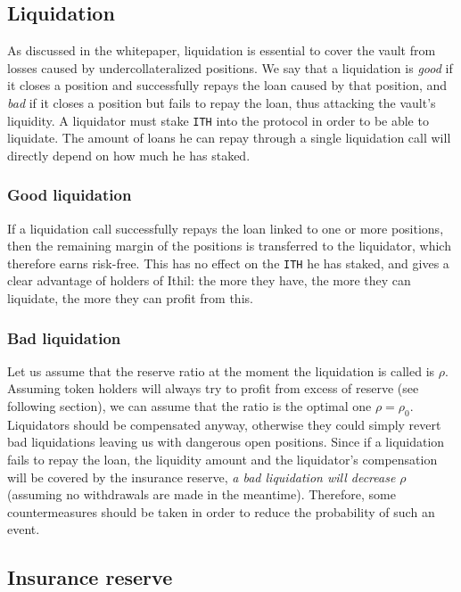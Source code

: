 \documentclass[a4paper,10 pt]{article}
\theoremstyle{definition}
\begin{document}
\subsection{Liquidation}

As discussed in the whitepaper, liquidation is essential to cover the vault from losses caused by undercollateralized positions. We say that a liquidation is {\it good} if it closes a position and successfully repays the loan caused by that position, and {\it bad} if it closes a position but fails to repay the loan, thus attacking the vault's liquidity. A liquidator must stake \verb|ITH| into the protocol in order to be able to liquidate. The amount of loans he can repay through a single liquidation call will directly depend on how much he has staked.

\subsubsection{Good liquidation}
If a liquidation call successfully repays the loan linked to one or more positions, then the remaining margin of the positions is transferred to the liquidator, which therefore earns risk-free. This has no effect on the \verb|ITH| he has staked, and gives a clear advantage of holders of Ithil: the more they have, the more they can liquidate, the more they can profit from this.

\subsubsection{Bad liquidation}
Let us assume that the reserve ratio at the moment the liquidation is called is $\rho$. Assuming token holders will always try to profit from excess of reserve (see following section), we can assume that the ratio is the optimal one $\rho=\rho_0$.  Liquidators should be compensated anyway, otherwise they could simply revert bad liquidations leaving us with dangerous open positions. Since if a liquidation fails to repay the loan, the liquidity amount and the liquidator's compensation will be covered by the insurance reserve, {\it a bad liquidation will decrease $\rho$} (assuming no withdrawals are made in the meantime). Therefore, some countermeasures should be taken in order to reduce the probability of such an event.

\subsection{Insurance reserve}
\end{document}
